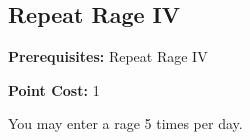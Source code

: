 \subsection*{Repeat Rage IV}\label{feat:repeatrage4}

\noindent
\textbf{Prerequisites:} Repeat Rage IV

\noindent
\textbf{Point Cost:} 1

You may enter a rage 5 times per day.
